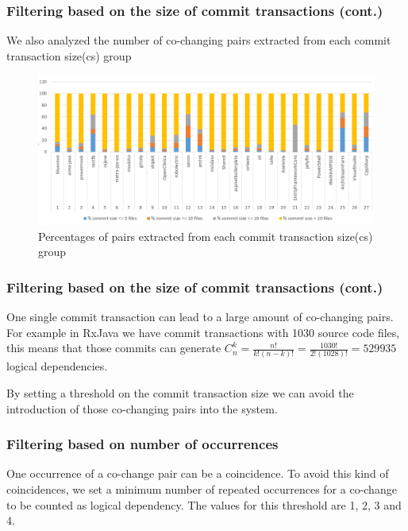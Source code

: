 \documentclass{beamer}
\newcommand*{\Comb}[2]{{}C^{#1}_{#2}}%
\begin{document}
 \begin{frame}
\frametitle{Filtering based on the size of commit transactions (cont.)}

We also analyzed the number of co-changing pairs extracted from each commit transaction size(cs) group

\begin{center}
     \begin{figure}
	\includegraphics[width=\textwidth]{ld_distribution.png}
	\caption{\label{fig:fig1} Percentages of pairs extracted from each commit transaction size(cs) group}
     \end{figure}
\end{center}
\end{frame}

 \begin{frame}
\frametitle{Filtering based on the size of commit transactions (cont.)}

One single commit transaction can lead to a large amount of co-changing pairs. 
 \vskip 0.3cm 
For example in RxJava we have commit transactions with 1030 source code files, this means that those commits can generate 
$\Comb{k}{n}=\frac{n!}{k!(n-k)!} = \frac{1030!}{2!(1028)!} = 529 935$ logical dependencies.
 \vskip 0.3cm 

 By setting a threshold on the commit transaction size we can avoid the introduction of those co-changing pairs into the system.

\end{frame}

 \begin{frame}
\frametitle{Filtering based on number of occurrences}
One occurrence of a co-change pair can be a coincidence. To avoid this kind of coincidences, we set a minimum number of
repeated occurrences for a co-change to be counted as logical dependency. The values for this threshold are 1,
2, 3 and 4.

\end{frame}
\end{document}
